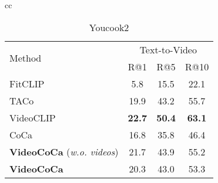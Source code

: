 \begin{table*}[t]
\begin{tabular}{cc}
  	\begin{subtable}[t]{0.48\linewidth}
  	\vspace{-0.5\baselineskip}
  		\setlength{\tabcolsep}{2pt} \centering
  		\caption{Youcook2}
  		\vspace{-0.3\baselineskip}
\scriptsize{
  			\begin{tabular}{l|ccc}
  				\toprule 
 \multirow{2}{*}{Method} & \multicolumn{3}{c}{Text-to-Video}  \\
 & \multirow{1}{*}{\footnotesize{R@1}} & \multirow{1}{*}{\footnotesize{R@5}} 
 & \multirow{1}{*}{\footnotesize{R@10}} \\
 \midrule
FitCLIP~\cite{castro2022fitclip} & 5.8 & 15.5 & 22.1  \\ 
TACo~\cite{yang2021taco} & 19.9 & 43.2 & 55.7  \\ 
VideoCLIP~\cite{xu2021videoclip} & \textbf{22.7} & \textbf{50.4} & \textbf{63.1} \\ \midrule
CoCa & 16.8 & 35.8 & 46.4  \\ 
\textbf{VideoCoCa} (\textit{w.o. videos}) & 21.7 & 43.9 & 55.2 \\ 
\textbf{VideoCoCa} & 20.3 & 43.0 & 53.3 \\ 
\bottomrule
\end{tabular} \label{tab:sota_youcook2_retrieval}
  		}
	\end{subtable}
	  \end{tabular}

	\label{tab:sota_ret}
	\vspace{-1.\baselineskip}
\end{table*}


